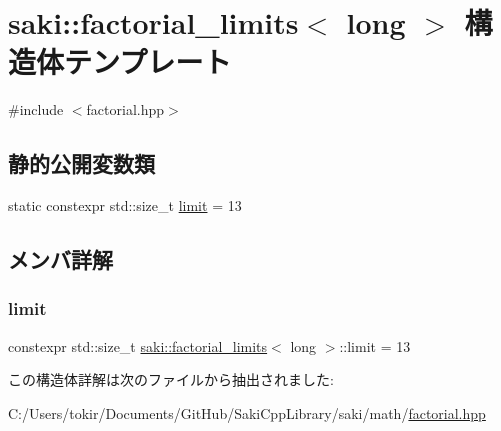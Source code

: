 \hypertarget{structsaki_1_1factorial__limits_3_01long_01_4}{}\section{saki\+:\+:factorial\+\_\+limits$<$ long $>$ 構造体テンプレート}
\label{structsaki_1_1factorial__limits_3_01long_01_4}


{\ttfamily \#include $<$factorial.\+hpp$>$}

\subsection*{静的公開変数類}
\begin{DoxyCompactItemize}
\item 
static constexpr std\+::size\+\_\+t \mbox{\hyperlink{structsaki_1_1factorial__limits_3_01long_01_4_a8a2b047d62f1ed082c8a1c652628cdcb}{limit}} = 13
\end{DoxyCompactItemize}


\subsection{メンバ詳解}
\mbox{\label{structsaki_1_1factorial__limits_3_01long_01_4_a8a2b047d62f1ed082c8a1c652628cdcb}} 
\subsubsection{\texorpdfstring{limit}{limit}}
{\footnotesize\ttfamily constexpr std\+::size\+\_\+t \mbox{\hyperlink{structsaki_1_1factorial__limits}{saki\+::factorial\+\_\+limits}}$<$ long $>$\+::limit = 13\hspace{0.3cm}{\ttfamily [static]}}



この構造体詳解は次のファイルから抽出されました\+:\begin{DoxyCompactItemize}
\item 
C\+:/\+Users/tokir/\+Documents/\+Git\+Hub/\+Saki\+Cpp\+Library/saki/math/\mbox{\hyperlink{factorial_8hpp}{factorial.\+hpp}}\end{DoxyCompactItemize}
